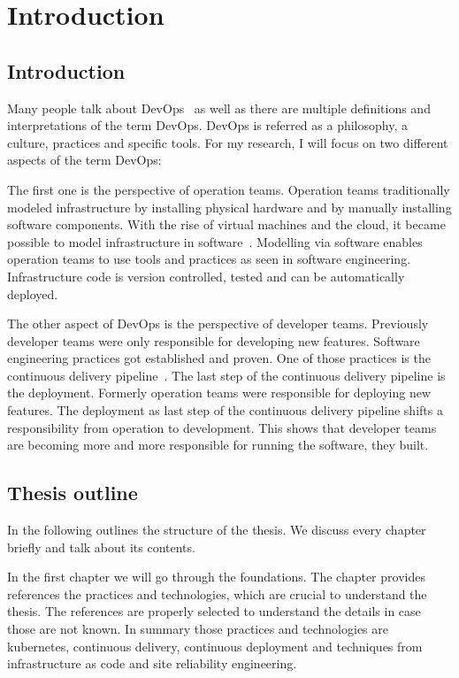 \chapter{Introduction}
\section{Introduction}

Many people talk about DevOps~\cite{devops_definition} as well as there are multiple
definitions and interpretations of the term DevOps. DevOps is referred as a philosophy, a
culture, practices and specific tools. For my research, I will focus on two different
aspects of the term DevOps:

The first one is the perspective of operation teams. Operation teams traditionally modeled
infrastructure by installing physical hardware and by manually installing software
components. With the rise of virtual machines and the cloud, it became possible to model
infrastructure in software~\cite{infra_as_code_platforms}. Modelling via software enables
operation teams to use tools and practices as seen in software engineering. Infrastructure
code is version controlled, tested and can be automatically deployed.

The other aspect of DevOps is the perspective of developer teams. Previously developer
teams were only responsible for developing new features. Software engineering practices
got established and proven. One of those practices is the continuous delivery
pipeline~\cite{cd_humble_pipeline}. The last step of the continuous delivery pipeline is the
deployment. Formerly operation teams were responsible for deploying new features. The
deployment as last step of the continuous delivery pipeline shifts a responsibility from
operation to development. This shows that developer teams are becoming more and more
responsible for running the software, they built.

\section{Thesis outline}

In the following outlines the structure of the thesis. We discuss every chapter briefly
and talk about its contents.

In the first chapter we will go through the foundations. The chapter provides references
the practices and technologies, which are crucial to understand the thesis. The references
are properly selected to understand the details in case those are not known. In summary
those practices and technologies are kubernetes, continuous delivery, continuous
deployment and techniques from infrastructure as code and site reliability engineering.

